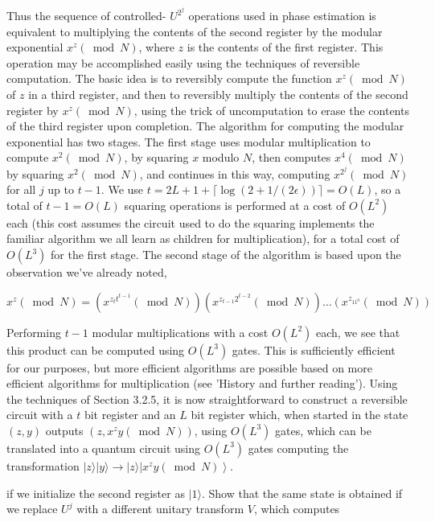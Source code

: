 Thus the sequence of controlled- $U^{2^{j}}$ operations used in phase estimation is equivalent to multiplying the contents of the second register by the modular exponential $x^{z}(\bmod N)$, where $z$ is the contents of the first register. This operation may be accomplished easily using the techniques of reversible computation. The basic idea is to reversibly compute the function $x^{z}(\bmod N)$ of $z$ in a third register, and then to reversibly multiply the contents of the second register by $x^{z}(\bmod N)$, using the trick of uncomputation to erase the contents of the third register upon completion. The algorithm for computing the modular exponential has two stages. The first stage uses modular multiplication to compute $x^{2}(\bmod N)$, by squaring $x$ modulo $N$, then computes $x^{4}(\bmod N)$ by squaring $x^{2}(\bmod N)$, and continues in this way, computing $x^{2^{j}}(\bmod N)$ for all $j$ up to $t-1$. We use $t=2 L+1+\lceil\log (2+1 /(2 \epsilon))\rceil=O(L)$, so a total of $t-1=O(L)$ squaring operations is performed at a cost of $O\left(L^{2}\right)$ each (this cost assumes the circuit used to do the squaring implements the familiar algorithm we all learn as children for multiplication), for a total cost of $O\left(L^{3}\right)$ for the first stage. The second stage of the algorithm is based upon the observation we've already noted,

\begin{equation}
    x^{z}(\bmod N)=\left(x^{z_{t} t^{t-1}}(\bmod N)\right)\left(x^{z_{t-1} 2^{t-2}}(\bmod N)\right) \ldots\left(x^{z_{11^{0}}}(\bmod N)\right) \tag{5.43}
\end{equation}

Performing $t-1$ modular multiplications with a cost $O\left(L^{2}\right)$ each, we see that this product can be computed using $O\left(L^{3}\right)$ gates. This is sufficiently efficient for our purposes, but more efficient algorithms are possible based on more efficient algorithms for multiplication (see 'History and further reading'). Using the techniques of Section 3.2.5, it is now straightforward to construct a reversible circuit with a $t$ bit register and an $L$ bit register which, when started in the state $(z, y)$ outputs $\left(z, x^{z} y(\bmod N)\right)$, using $O\left(L^{3}\right)$ gates, which can be translated into a quantum circuit using $O\left(L^{3}\right)$ gates computing the transformation $|z\rangle|y\rangle \rightarrow|z\rangle\left|x^{z} y(\bmod N)\right\rangle$.

if we initialize the second register as $|1\rangle$. Show that the same state is obtained if we replace $U^{j}$ with a different unitary transform $V$, which computes

